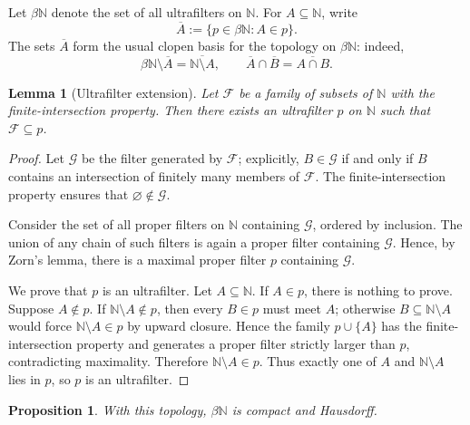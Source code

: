 \documentclass[11pt]{article}
\newtheorem{lemma}[theorem]{Lemma}
\newtheorem{proposition}[theorem]{Proposition}
\newcommand{\NN}{\mathbb N}
\newcommand{\cl}[1]{\overline{#1}}
\begin{document}
Let $\beta\NN$ denote the set of all ultrafilters on $\NN$. For $A\subseteq\NN$, write
\[
    \cl A:=\{p\in\beta\NN:A\in p\}.
\]
The sets $\cl A$ form the usual clopen basis for the topology on $\beta\NN$: indeed,
\[
    \beta\NN\setminus\cl A=\cl{\NN\setminus A},
    \qquad
    \cl A\cap\cl B=\cl{A\cap B}.
\]

\begin{lemma}[Ultrafilter extension]\label{lem:ultrafilterextension}
Let $\mathcal F$ be a family of subsets of $\NN$ with the finite-intersection property. Then there exists an ultrafilter $p$ on $\NN$ such that $\mathcal F\subseteq p$.
\end{lemma}

\begin{proof}
Let $\mathcal G$ be the filter generated by $\mathcal F$; explicitly, $B\in\mathcal G$ if and only if $B$ contains an intersection of finitely many members of $\mathcal F$. The finite-intersection property ensures that $\varnothing\notin\mathcal G$.

Consider the set of all proper filters on $\NN$ containing $\mathcal G$, ordered by inclusion. The union of any chain of such filters is again a proper filter containing $\mathcal G$. Hence, by Zorn's lemma, there is a maximal proper filter $p$ containing $\mathcal G$.

We prove that $p$ is an ultrafilter. Let $A\subseteq\NN$. If $A\in p$, there is nothing to prove. Suppose $A\notin p$. If $\NN\setminus A\notin p$, then every $B\in p$ must meet $A$; otherwise $B\subseteq\NN\setminus A$ would force $\NN\setminus A\in p$ by upward closure. Hence the family $p\cup\{A\}$ has the finite-intersection property and generates a proper filter strictly larger than $p$, contradicting maximality. Therefore $\NN\setminus A\in p$. Thus exactly one of $A$ and $\NN\setminus A$ lies in $p$, so $p$ is an ultrafilter.
\end{proof}

\begin{proposition}\label{prop:compactbeta}
With this topology, $\beta\NN$ is compact and Hausdorff.
\end{proposition}
\end{document}
